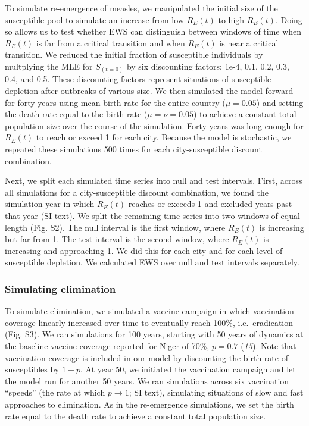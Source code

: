 \documentclass[3p]{elsarticle} %
\begin{document}
To simulate re-emergence of measles, we manipulated the initial size of
the susceptible pool to simulate an increase from low \(R_E(t)\) to high
\(R_E(t)\). Doing so allows us to test whether EWS can distinguish
between windows of time when \(R_E(t)\) is far from a critical
transition and when \(R_E(t)\) is near a critical transition. We reduced
the initial fraction of susceptible individuals by multplying the MLE
for \(S_{(t=0)}\) by six discounting factors: 1e-4, 0.1, 0.2, 0.3, 0.4,
and 0.5. These discounting factors represent situations of susceptible
depletion after outbreaks of various size. We then simulated the model
forward for forty years using mean birth rate for the entire country
(\(\mu = 0.05\)) and setting the death rate equal to the birth rate
(\(\mu = \nu = 0.05\)) to achieve a constant total population size over
the course of the simulation. Forty years was long enough for \(R_E(t)\)
to reach or exceed 1 for each city. Because the model is stochastic, we
repeated these simulations 500 times for each city-susceptible discount
combination.

Next, we split each simulated time series into null and test intervals.
First, across all simulations for a city-susceptible discount
combination, we found the simulation year in which \(R_E(t)\) reaches or
exceeds 1 and excluded years past that year (SI text). We split the
remaining time series into two windows of equal length (Fig. S2). The
null interval is the first window, where \(R_E(t)\) is increasing but
far from 1. The test interval is the second window, where \(R_E(t)\) is
increasing and approaching 1. We did this for each city and for each
level of susceptible depletion. We calculated EWS over null and test
intervals separately.

\hypertarget{simulating-elimination}{%
\subsubsection{Simulating elimination}\label{simulating-elimination}}

To simulate elimination, we simulated a vaccine campaign in which
vaccination coverage linearly increased over time to eventually reach
100\%, i.e.~eradication (Fig. S3). We ran simulations for 100 years,
starting with 50 years of dynamics at the baseline vaccine coverage
reported for Niger of 70\%, \(p = 0.7\) (\emph{15}). Note that
vaccination coverage is included in our model by discounting the birth
rate of susceptibles by \(1-p\). At year 50, we initiated the
vaccination campaign and let the model run for another 50 years. We ran
simulations across six vaccination ``speeds'' (the rate at which
\(p \rightarrow 1\); SI text), simulating situations of slow and fast
approaches to elimination. As in the re-emergence simulations, we set
the birth rate equal to the death rate to achieve a constant total
population size.
\end{document}
